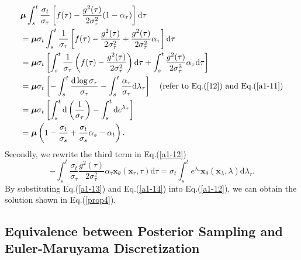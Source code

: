\begin{align}
&\boldsymbol{\mu}\int_s^t\frac{\sigma_t}{\sigma_\tau}\left[f(\tau)-\frac{g^2(\tau)}{2\sigma^2_\tau}(1-\alpha_\tau)\right]\mathrm{d}\tau \nonumber\\
&=\boldsymbol\mu\sigma_t\int_s^t\frac{1}{\sigma_\tau}\left[f(\tau)-\frac{g^2(\tau)}{2\sigma^2_\tau}+\frac{g^2(\tau)}{2\sigma^2_\tau}\alpha_\tau\right]\mathrm{d}\tau \nonumber\\
&=\boldsymbol\mu\sigma_t\left[\int_s^t\frac{1}{\sigma_\tau}\left(f(\tau)-\frac{g^2(\tau)}{2\sigma^2_\tau}\right)\mathrm{d}\tau +\int_s^t\frac{g^2(\tau)}{2\sigma^3_\tau}\alpha_\tau\mathrm{d}\tau \right] \nonumber\\
&=\boldsymbol\mu\sigma_t\left[-\int_s^t\frac{\mathrm{d}\log{\sigma_\tau}}{\sigma_\tau}
-\int_s^t\frac{\alpha_\tau}{\sigma_\tau}\mathrm{d}\lambda_\tau \right] \quad\text{(refer to Eq.(\ref{12}) and Eq.(\ref{a1-11})} \nonumber\\
&=\boldsymbol\mu\sigma_t\left[\int_s^t\mathrm{d}\left(\frac{1}{\sigma_\tau}\right)-\int_s^t\mathrm{d}e^{\lambda_\tau} \right] \nonumber\\
&=\boldsymbol{\mu}\left(1-\frac{\sigma_t}{\sigma_s}+\frac{\sigma_t}{\sigma_s}\alpha_s-\alpha_t\right).
\label{a1-13}
\end{align}
Secondly, we rewrite the third term in Eq.(\ref{a1-12})
\begin{equation}
-\int_s^t\frac{\sigma_t}{\sigma_\tau}\frac{g^2(\tau)}{2\sigma_\tau^2}\alpha_\tau\boldsymbol{x}_\theta(\boldsymbol{x}_\tau,\tau)\mathrm{d}\tau
=\sigma_t\int_s^te^{\lambda_\tau}\boldsymbol{x}_\theta(\boldsymbol{x}_\lambda,\lambda)\mathrm{d}\lambda_\tau.
\label{a1-14}
\end{equation}
By substituting Eq.(\ref{a1-13}) and Eq.(\ref{a1-14}) into Eq.(\ref{a1-12}), we can obtain the solution shown in Eq.(\ref{prop4}).

\subsection{Equivalence between Posterior Sampling and Euler-Maruyama Discretization}
\label{appa2}

